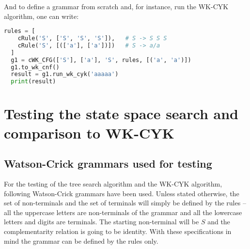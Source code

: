 And to define a grammar from scratch and, for instance, run the WK-CYK algorithm, one can write:
\begin{lstlisting}[language=Python]
  rules = [
    cRule('S', ['S', 'S', 'S']),   # S -> S S S
    cRule('S', [(['a'], ['a'])])   # S -> a/a
  ]
  g1 = cWK_CFG(['S'], ['a'], 'S', rules, [('a', 'a')])
  g1.to_wk_cnf()
  result = g1.run_wk_cyk('aaaaa')
  print(result)
\end{lstlisting}


\chapter{Testing the state space search and comparison to WK-CYK} \label{chapter:testing}

\section{Watson-Crick grammars used for testing}

For the testing of the tree search algorithm and the WK-CYK algorithm, following Watson-Crick grammars have been used. Unless stated otherwise, the set of non-terminals and the set of terminals will simply be defined by the rules -- all the uppercase letters are non-terminals of the grammar and all the lowercase letters and digits are terminals. The starting non-terminal will be $S$ and the complementarity relation is going to be identity. With these specifications in mind the grammar can be defined by the rules only.

